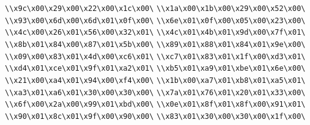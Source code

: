 \verb|\\x9c\x00\x29\x00\x22\x00\x1c\x00\|\newline
\verb|\\x1a\x00\x1b\x00\x29\x00\x52\x00\|\newline
\verb|\\x93\x00\x6d\x00\x6d\x01\x0f\x00\|\newline
\verb|\\x6e\x01\x0f\x00\x05\x00\x23\x00\|\newline
\verb|\\x4c\x00\x26\x01\x56\x00\x32\x01\|\newline
\verb|\\x4c\x01\x4b\x01\x9d\x00\x7f\x01\|\newline
\verb|\\x8b\x01\x84\x00\x87\x01\x5b\x00\|\newline
\verb|\\x89\x01\x88\x01\x84\x01\x9e\x00\|\newline
\verb|\\x09\x00\x83\x01\x4d\x00\xc6\x01\|\newline
\verb|\\xc7\x01\x83\x01\x1f\x00\xd3\x01\|\newline
\verb|\\xd4\x01\xce\x01\x9f\x01\xa2\x01\|\newline
\verb|\\xb5\x01\xa9\x01\xbe\x01\x6e\x00\|\newline
\verb|\\x21\x00\xa4\x01\x94\x00\xf4\x00\|\newline
\verb|\\x1b\x00\xa7\x01\xb8\x01\xa5\x01\|\newline
\verb|\\xa3\x01\xa6\x01\x30\x00\x30\x00\|\newline
\verb|\\x7a\x01\x76\x01\x20\x01\x33\x00\|\newline
\verb|\\x6f\x00\x2a\x00\x99\x01\xbd\x00\|\newline
\verb|\\x0e\x01\x8f\x01\x8f\x00\x91\x01\|\newline
\verb|\\x90\x01\x8c\x01\x9f\x00\x90\x00\|\newline
\verb|\\x83\x01\x30\x00\x30\x00\x1f\x00\|\newline
